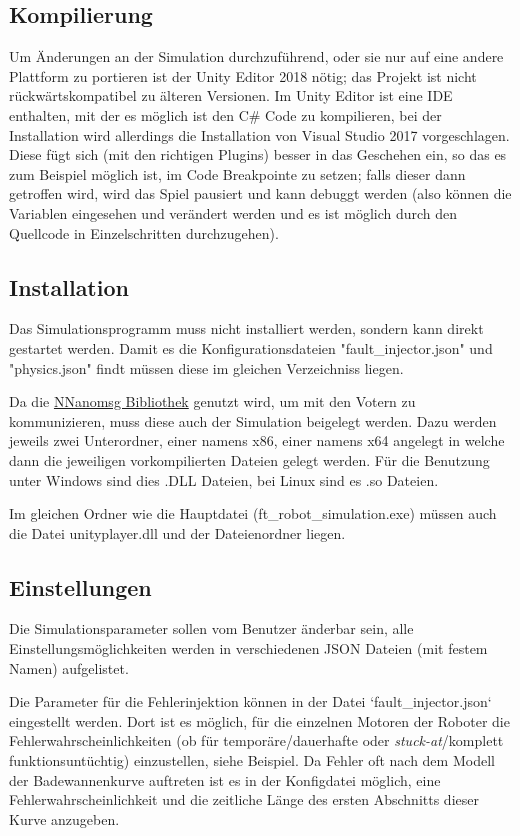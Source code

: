 \documentclass[
    12pt,
    bibliography=totoc,
    ngerman,
    enabledeprecatedfontcommands
]{scrartcl}
\begin{document}
\subsection{Kompilierung}
Um {\"{A}}nderungen an der Simulation durchzuf{\"{u}}hrend, oder sie nur auf eine andere Plattform
zu portieren ist der Unity Editor 2018 n{\"{o}}tig; das Projekt ist nicht r{\"{u}}ckw{\"{a}}rtskompatibel zu {\"{a}}lteren Versionen. Im Unity Editor
ist eine IDE enthalten, mit der es m{\"{o}}glich ist den C\# Code zu kompilieren, bei der Installation wird allerdings die Installation von Visual Studio
2017 vorgeschlagen. Diese f{\"{u}}gt sich (mit den richtigen Plugins) besser in das Geschehen ein, so das es zum Beispiel m{\"{o}}glich ist, im Code
Breakpointe zu setzen; falls dieser dann getroffen wird, wird das Spiel pausiert und kann debuggt werden (also k{\"{o}}nnen die Variablen eingesehen
und ver{\"{a}}ndert werden und es ist m{\"{o}}glich durch den Quellcode in Einzelschritten durchzugehen).


\subsection{Installation}
Das Simulationsprogramm muss nicht installiert werden, sondern kann direkt gestartet werden. Damit es die Konfigurationsdateien "fault\_injector.json" und
"physics.json" findt m{\"{u}}ssen diese im gleichen Verzeichniss liegen.

Da die \href{https://github.com/mhowlett/NNanomsg}{NNanomsg Bibliothek} genutzt wird, um mit den Votern zu kommunizieren, muss diese auch der Simulation beigelegt werden. 
Dazu werden jeweils zwei Unterordner, einer namens x86, einer namens x64 angelegt in welche dann die jeweiligen vorkompilierten Dateien gelegt werden. F{\"{u}}r die
Benutzung unter Windows sind dies .DLL Dateien, bei Linux sind es .so Dateien.

Im gleichen Ordner wie die Hauptdatei (ft\_robot\_simulation.exe) m{\"{u}}ssen auch die Datei unityplayer.dll und der Dateienordner liegen.

\subsection{Einstellungen}
Die Simulationsparameter sollen vom Benutzer {\"{a}}nderbar sein, alle Einstellungsm{\"{o}}glichkeiten werden in verschiedenen JSON Dateien (mit festem Namen) aufgelistet.

Die Parameter f{\"{u}}r die Fehlerinjektion k{\"{o}}nnen in der Datei `fault\_injector.json` eingestellt werden. Dort ist es m{\"{o}}glich, f{\"{u}}r die einzelnen Motoren
der Roboter die Fehlerwahrscheinlichkeiten (ob f{\"{u}}r tempor{\"{a}}re/dauerhafte oder \textit{stuck-at}/komplett funktionsunt{\"{u}}chtig) einzustellen, siehe
Beispiel. Da Fehler oft nach dem Modell der Badewannenkurve auftreten ist es in der Konfigdatei m{\"{o}}glich, eine Fehlerwahrscheinlichkeit und die zeitliche L{\"{a}}nge
des ersten Abschnitts dieser Kurve anzugeben.

\end{document}
